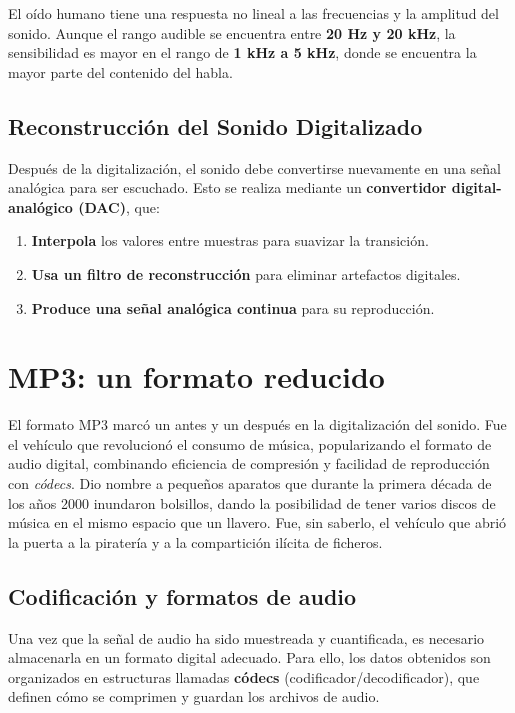 El oído humano tiene una respuesta no lineal a las frecuencias y la amplitud del sonido. Aunque el rango audible se encuentra entre \textbf{20 Hz y 20 kHz}, la sensibilidad es mayor en el rango de \textbf{1 kHz a 5 kHz}, donde se encuentra la mayor parte del contenido del habla.

\subsection{Reconstrucción del Sonido Digitalizado}

Después de la digitalización, el sonido debe convertirse nuevamente en una señal analógica para ser escuchado. Esto se realiza mediante un \textbf{convertidor digital-analógico (DAC)}, que:
\begin{enumerate}
    \item \textbf{Interpola} los valores entre muestras para suavizar la transición.
    \item \textbf{Usa un filtro de reconstrucción} para eliminar artefactos digitales.
    \item \textbf{Produce una señal analógica continua} para su reproducción.
\end{enumerate}

\section{MP3: un formato reducido}

El formato MP3 marcó un antes y un después en la digitalización del sonido. Fue el vehículo que revolucionó el consumo de música, popularizando el formato de audio digital, combinando eficiencia de compresión y facilidad de reproducción con \emph{códecs}. Dio nombre a pequeños aparatos que durante la primera década de los años 2000 inundaron bolsillos, dando la posibilidad de tener varios discos de música en el mismo espacio que un llavero. Fue, sin saberlo, el vehículo que abrió la puerta a la piratería y a la compartición ilícita de ficheros.

\subsection{Codificación y formatos de audio}

Una vez que la señal de audio ha sido muestreada y cuantificada, es necesario almacenarla en un formato digital adecuado. Para ello, los datos obtenidos son organizados en estructuras llamadas \textbf{códecs} (codificador/decodificador), que definen cómo se comprimen y guardan los archivos de audio.


